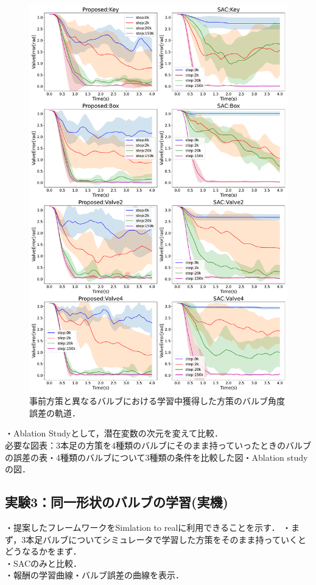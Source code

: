 \documentclass[dvipdfmx]{ampbt_nomag}
\begin{document}
\begin{figure}[H]
  \centering
  \includegraphics[width=16cm]
       {asset/img/ValveTrajectory_SimTurn180Other.pdf}
  \caption{事前方策と異なるバルブにおける学習中獲得した方策のバルブ角度誤差の軌道．}
  \label{dclaw_mujoco}
\end{figure}
・Ablation Studyとして，潜在変数の次元を変えて比較．\\
必要な図表：3本足の方策を4種類のバルブにそのまま持っていったときのバルブの誤差の表・4種類のバルブについて3種類の条件を比較した図・Ablation studyの図．\\

\subsection{実験3：同一形状のバルブの学習(実機)}
・提案したフレームワークをSimlation to realに利用できることを示す．
・まず，3本足バルブについてシミュレータで学習した方策をそのまま持っていくとどうなるかをまず．\\
・SACのみと比較．\\
・報酬の学習曲線・バルブ誤差の曲線を表示．
\end{document}

